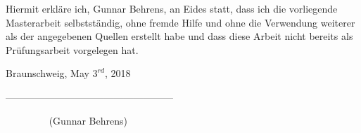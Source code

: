 \documentclass[a4paper, 11pt]{scrreprt}
\begin{document}
\bigskip

Hiermit erkläre ich, Gunnar Behrens, an Eides statt, dass ich die vorliegende \linebreak Masterarbeit selbstständig, 
ohne fremde Hilfe und ohne die Verwendung weiterer als der angegebenen Quellen erstellt habe und dass diese Arbeit nicht bereits als Prüfungsarbeit vorgelegen hat.

\bigskip \bigskip \bigskip

Braunschweig, May $3^{rd}$, 2018

\bigskip

\bigskip

\bigskip

---------------------------------------------------

$\phantom{mmmm..}$  (Gunnar Behrens)
\end{document}
